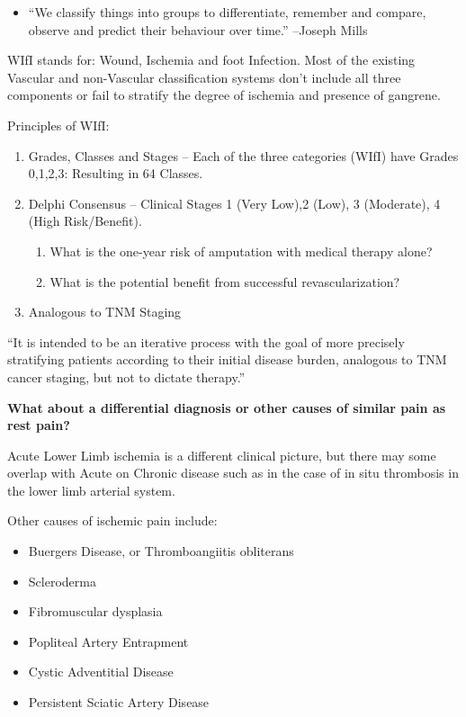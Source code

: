\documentclass[
]{book}
\providecommand{\tightlist}{%
  \setlength{\itemsep}{0pt}\setlength{\parskip}{0pt}}
\begin{document}
\begin{itemize}
\tightlist
\item
  ``We classify things into groups to differentiate, remember and
  compare, observe and predict their behaviour over time.'' --Joseph
  Mills
\end{itemize}

WIfI stands for: Wound, Ischemia and foot Infection. Most of the
existing Vascular and non-Vascular classification systems don't include
all three components or fail to stratify the degree of ischemia and
presence of gangrene.

Principles of WIfI:

\begin{enumerate}
\def\labelenumi{\arabic{enumi}.}
\item
  Grades, Classes and Stages -- Each of the three categories (WIfI)
  have Grades 0,1,2,3: Resulting in 64 Classes.
\item
  Delphi Consensus -- Clinical Stages 1 (Very Low),2 (Low), 3
  (Moderate), 4 (High Risk/Benefit).

  \begin{enumerate}
  \def\labelenumii{\arabic{enumii}.}
  \item
    What is the one-year risk of amputation with medical therapy
    alone?
  \item
    What is the potential benefit from successful revascularization?
  \end{enumerate}
\item
  Analogous to TNM Staging
\end{enumerate}

``It is intended to be an iterative process with the goal of more
precisely stratifying patients according to their initial disease
burden, analogous to TNM cancer staging, but not to dictate therapy.''

\textbf{What about a differential diagnosis or other causes of similar pain as
rest pain?}

Acute Lower Limb ischemia is a different clinical picture, but there may
some overlap with Acute on Chronic disease such as in the case of in
situ thrombosis in the lower limb arterial system.

Other causes of ischemic pain include:

\begin{itemize}
\item
  Buergers Disease, or Thromboangiitis obliterans
\item
  Scleroderma
\item
  Fibromuscular dysplasia
\item
  Popliteal Artery Entrapment
\item
  Cystic Adventitial Disease
\item
  Persistent Sciatic Artery Disease
\end{itemize}
\end{document}

